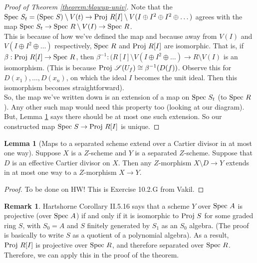 \documentclass[10pt,reqno]{amsart}
\theoremstyle{definition}
\newtheorem{lemma}[theorem]{Lemma}
\newtheorem{remark}[theorem]{Remark}
\theoremstyle{remark}
\numberwithin{equation}{section}
\numberwithin{theorem}{section}
\newcommand{\spec}{\textup{Spec }}
\newcommand{\proj}{\textup{Proj }}
\newcommand{\SSS}{{\mathscr S}}
\begin{document}
\begin{proof}[Proof of Theorem \ref{theorem:blowup-univ}]
Note that the $\spec S_t = (\spec S) \setminus V(t) \to \proj R[I] \setminus V(I \oplus I^2 \oplus I^2 \oplus \dots)$ agrees with the map $\spec S_t \to \spec R \setminus V(I) \to \spec R$.
\\

This is because of how we've defined the map and because away from $V(I)$ and $V(I \oplus I^2 \oplus \dots)$ respectively, $\spec R$ and $\proj R[I]$ are isomorphic. That is, if $\beta: \proj R[I] \to \spec R$, then $\beta^{-1}: (R[I] \setminus V(I \oplus I^2 \oplus \dots) \to R \setminus V(I)$ is an isomorphism. (This is because $\proj \SSS(U_f) \cong \beta^{-1}(D(f))$. Observe this for $D(x_1), \dots , D(x_n)$, on which the ideal $I$ becomes the unit ideal. Then this isomorphism becomes straightforward). 
\\

So, the map we've written down is an extension of a map on $\spec S_t$ (to $\spec R$). Any other such map would need this property too (looking at our diagram). But, Lemma \ref{lemma:extend-over-cartier} says there should be at most one such extension. So our constructed map $\spec S \to \proj R[I]$ is unique.

\end{proof}

\begin{lemma}[Maps to a separated scheme extend over a Cartier divisor in at most one way]\label{lemma:extend-over-cartier} Suppose $X$ is a $Z$-scheme and $Y$ is a separated $Z$-scheme. Suppose that $D$ is an effective Cartier divisor on $X$. Then any $Z$-morphism $X \setminus D \to Y$ extends in at most one way to a $Z$-morphism $X \to Y$.
\end{lemma}
\begin{proof}
To be done on HW! This is Exercise 10.2.G from Vakil.
\end{proof}

\begin{remark}
Hartshorne Corollary II.5.16 says that a scheme $Y$ over $\spec A$ is projective (over $\spec A$)  if and only if it is isomorphic to $\proj S$ for some graded ring $S$, with $S_0 = A$ and $S$ finitely generated by $S_1$ as an $S_0$ algebra. (The proof is basically to write $S$ as a quotient of a polynomial algebra). As a result, $\proj R[I]$ is projective over $\spec R$, and therefore separated over $\spec R$. Therefore, we can apply this in the proof of the theorem.
\end{remark}
\end{document}
